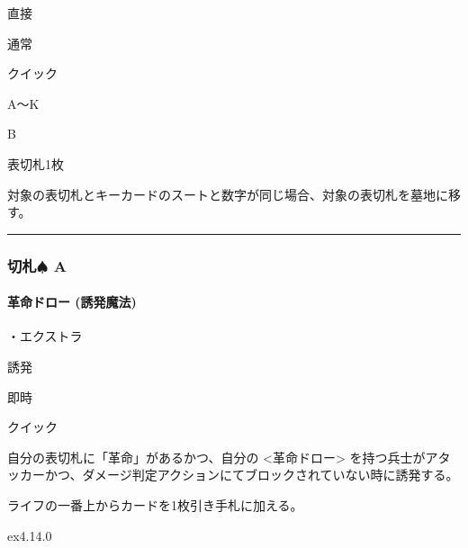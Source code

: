 \documentclass[letterpaper,10pt,dvipdfmx]{sphinxmanual}
\begin{document}
\sphinxAtStartPar
{} 直接

\sphinxAtStartPar
{} 通常

\sphinxAtStartPar
{} クイック

\sphinxAtStartPar
{} A〜K

\sphinxAtStartPar
{} B

\sphinxAtStartPar
{}

\sphinxAtStartPar
表切札1枚

\sphinxAtStartPar
{}

\sphinxAtStartPar
対象の表切札とキーカードのスートと数字が同じ場合、対象の表切札を墓地に移す。


\bigskip\hrule\bigskip



\subsubsection{切札{\normalsize $\spadesuit$} A}
\label{\detokenize{auto/frameActionlist:a}}

\paragraph{革命ドロー (誘発魔法)}
\label{\detokenize{auto/frameActionlist:act-revolutiondraw}}\label{\detokenize{auto/frameActionlist:id15}}
\sphinxAtStartPar
{}

\sphinxAtStartPar
・エクストラ

\sphinxAtStartPar
{} 誘発

\sphinxAtStartPar
{} 即時

\sphinxAtStartPar
{} クイック

\sphinxAtStartPar
{}

\sphinxAtStartPar
自分の表切札に「革命」があるかつ、自分の \textless{}革命ドロー\textgreater{} を持つ兵士がアタッカーかつ、ダメージ判定アクションにてブロックされていない時に誘発する。

\sphinxAtStartPar
{}

\sphinxAtStartPar
ライフの一番上からカードを1枚引き手札に加える。

\sphinxAtStartPar
{}  ex4.14.0
\end{document}
